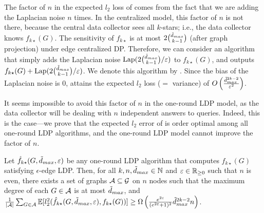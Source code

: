 The factor of $n$ in the 
expected $l_2$ loss 
of 
comes from the fact that we are adding 
the Laplacian noise 
$n$ times. 
In the centralized model, this factor of $n$ is not there, because the central data collector sees all $k$-stars; i.e., the data collector knows $f_{k\star}(G)$. 
The 
sensitivity of $f_{k\star}$ is 
at most $2\binom{\tilde{d}_{max}}{k-1}$ (after graph projection) under edge centralized DP. 
Therefore, we can consider an algorithm that simply adds the Laplacian noise $\textrm{Lap}(2\binom{\tilde{d}_{max}}{k-1}/\varepsilon)$ to $f_{k\star}(G)$, and outputs $f_{k\star}(G) + \textrm{Lap}(2\binom{\tilde{d}_{max}}{k-1}/\varepsilon)$. 
We denote this algorithm by . 
Since the bias of the Laplacian noise is $0$, 
 attains the expected $l_2$ loss ($=$ variance) of $O\left(\frac{\tilde{d}_{max}^{2k-2}}{\varepsilon^2}\right)$. 

It seems impossible to avoid this factor of $n$ in the 
one-round 
LDP model, as the data collector will be dealing with $n$ independent answers to
queries. Indeed, this is the case---we prove that the expected $l_2$ error of  
is order optimal among all 
one-round 
LDP algorithms, and 
the 
one-round 
LDP model cannot
improve 
the factor of $n$.

\begin{corollary}\label{cor:kstars-lb}
  Let 
  $\hat{f}_{k\star}(G,\tilde{d}_{max},\varepsilon)$
  be any 
  one-round 
  LDP algorithm that 
  computes $f_{k\star}(G)$ satisfying $\epsilon$-edge LDP. Then, for all
  $k,n,\tilde{d}_{max} \in \mathbb{N}$ and $\varepsilon \in \mathbb{R}_{\ge0}$ such that 
  $n$ is even, 
  there exists a set of graphs 
  $\mathcal{A} \subseteq \mathcal{G}$ 
  on $n$ 
  nodes 
  such that 
  the maximum degree of each 
  $G \in \mathcal{A}$ 
  is
  at most $\tilde{d}_{max}$,
  and 
  $\frac{1}{|\mathcal{A}|}\sum_{G \in \mathcal{A}} \mathbb{E}[l_2^2(\hat{f}_{k\star}(G,\tilde{d}_{max},\varepsilon), f_{k\star}(G))] 
  \geq 
  \Omega\left(\frac{e^{2\varepsilon}}{(e^{2\varepsilon}+1)^2}\tilde{d}_{max}^{2k-2}n \right)$.
\end{corollary}

